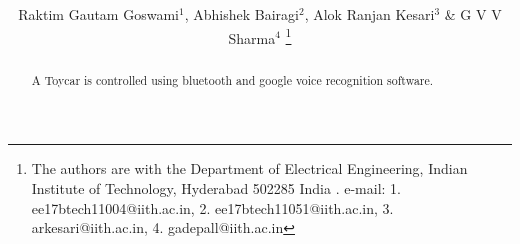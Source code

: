 \documentclass[journal,12pt,twocolumn]{IEEEtran}
\begin{document}
\def\putbox#1#2#3{\makebox[0in][l]{\makebox[#1][l]{}\raisebox{\baselineskip}[0in][0in]{\raisebox{#2}[0in][0in]{#3}}}}
     \def\rightbox#1{\makebox[0in][r]{#1}}
     \def\centbox#1{\makebox[0in]{#1}}
     \def\topbox#1{\raisebox{-\baselineskip}[0in][0in]{#1}}
     \def\midbox#1{\raisebox{-0.5\baselineskip}[0in][0in]{#1}}

\vspace{3cm}

\title{ 
}
\author{Raktim Gautam Goswami$^{1}$, Abhishek Bairagi$^{2}$, Alok Ranjan Kesari$^{3} 
$ \& G V V Sharma$^{4}$ 
\thanks{The authors are with the Department
of Electrical Engineering, Indian Institute of Technology, Hyderabad
502285 India .  e-mail: 1. ee17btech11004@iith.ac.in, 2. ee17btech11051@iith.ac.in, 3. arkesari@iith.ac.in, 4. gadepall@iith.ac.in}%
}




\maketitle


\tableofcontents

\renewcommand{\thefigure}{\theenumi}
\renewcommand{\thetable}{\theenumi}


\bigskip

\begin{abstract}
%
A Toycar is controlled using bluetooth and google voice recognition software.
%
\end{abstract}
\end{document}
